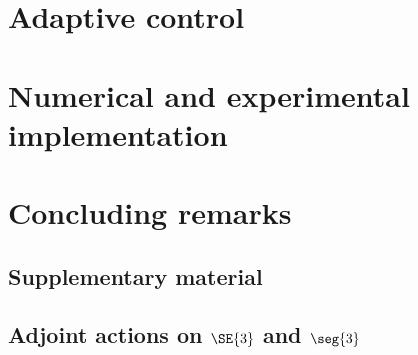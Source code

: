 \clearpage
\section{Adaptive control}
\label{sec: chap2 section header}


\clearpage
\section{Numerical and experimental implementation}
\label{sec: chap2 section header}


\section{Concluding remarks}

% 
\begin{subappendices}
\section{Supplementary material}
\subsection{Adjoint actions on $\SE{3}$ and $\seg{3}$} 
\label{app:C2:adjoint}   

\end{subappendices}
\fi

